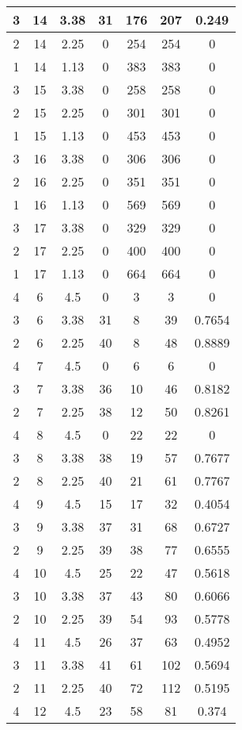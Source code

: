 \documentclass[letterpaper, 12pt]{article}
\begin{document}
\begin{longtable}{|c|c|c|c|c|c|c|}
\hline
3 & 14 & 3.38 & 31 & 176 & 207 & 0.249 \\
\hline
2 & 14 & 2.25 & 0 & 254 & 254 & 0 \\
\hline
1 & 14 & 1.13 & 0 & 383 & 383 & 0 \\
\hline
3 & 15 & 3.38 & 0 & 258 & 258 & 0 \\
\hline
2 & 15 & 2.25 & 0 & 301 & 301 & 0 \\
\hline
1 & 15 & 1.13 & 0 & 453 & 453 & 0 \\
\hline
3 & 16 & 3.38 & 0 & 306 & 306 & 0 \\
\hline
2 & 16 & 2.25 & 0 & 351 & 351 & 0 \\
\hline
1 & 16 & 1.13 & 0 & 569 & 569 & 0 \\
\hline
3 & 17 & 3.38 & 0 & 329 & 329 & 0 \\
\hline
2 & 17 & 2.25 & 0 & 400 & 400 & 0 \\
\hline
1 & 17 & 1.13 & 0 & 664 & 664 & 0 \\
\hline
4 & 6 & 4.5 & 0 & 3 & 3 & 0 \\
\hline
3 & 6 & 3.38 & 31 & 8 & 39 & 0.7654 \\
\hline
2 & 6 & 2.25 & 40 & 8 & 48 & 0.8889 \\
\hline
4 & 7 & 4.5 & 0 & 6 & 6 & 0 \\
\hline
3 & 7 & 3.38 & 36 & 10 & 46 & 0.8182 \\
\hline
2 & 7 & 2.25 & 38 & 12 & 50 & 0.8261 \\
\hline
4 & 8 & 4.5 & 0 & 22 & 22 & 0 \\
\hline
3 & 8 & 3.38 & 38 & 19 & 57 & 0.7677 \\
\hline
2 & 8 & 2.25 & 40 & 21 & 61 & 0.7767 \\
\hline
4 & 9 & 4.5 & 15 & 17 & 32 & 0.4054 \\
\hline
3 & 9 & 3.38 & 37 & 31 & 68 & 0.6727 \\
\hline
2 & 9 & 2.25 & 39 & 38 & 77 & 0.6555 \\
\hline
4 & 10 & 4.5 & 25 & 22 & 47 & 0.5618 \\
\hline
3 & 10 & 3.38 & 37 & 43 & 80 & 0.6066 \\
\hline
2 & 10 & 2.25 & 39 & 54 & 93 & 0.5778 \\
\hline
4 & 11 & 4.5 & 26 & 37 & 63 & 0.4952 \\
\hline
3 & 11 & 3.38 & 41 & 61 & 102 & 0.5694 \\
\hline
2 & 11 & 2.25 & 40 & 72 & 112 & 0.5195 \\
\hline
4 & 12 & 4.5 & 23 & 58 & 81 & 0.374 \\

\end{longtable}
\end{document}
